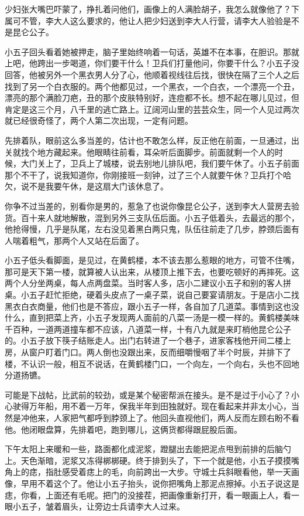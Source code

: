 少妇张大嘴巴吓蒙了，挣扎着问他们，画像上的人满脸胡子，我怎么就像他了？下属可不管，李大人这么要求的，他让人把少妇送到李大人行营，请李大人验验是不是昆仑公子。

小五子回头看着她被押走，脑子里始终响着一句话，英雄不在本事，在胆识。那就上吧，他跨出一步喝道，你们要干什么！卫兵们打量他问，你要干什么？小五子没回答，他被另外一个黑衣男人分了心，他顺着视线往后找，很快在隔了三个人之后找到了另一个白衣服的。两个他都见过，一个黑衣，一个白衣，一个漂亮一个丑，漂亮的那个满脸刀疤，丑的那个皮肤特别好，连痘都不长。想不起在哪儿见过，但肯定是这三个月，八千里的逃亡路上。辽阔河山里的芸芸众生，同一个人见过两次就已经很奇怪了，两个人第二次出现，一定有问题。

先排着队，眼前这么多当差的，估计也不敢怎么样，反正他在前面，一旦通过，出关就找个地方藏起来。他眼睛往前看，耳朵听后面脚步。前面就剩一个人的时
候，大门关上了，卫兵上了城楼，说去别地儿排队吧，我们要午休了。小五子前面那个不干了，说我知道你，你刚接班一刻钟，过了三个人就要午休？卫兵打个哈欠，说不是我要午休，是这扇大门该休息了。

你争不过当差的，别看你是男的，惹急了也说你像昆仑公子，送到李大人营房去验货。百十来人就地解散，混到另外三支队伍后面。小五子低着头，去最远的那个，他抢得慢，几乎是队尾，左右没见着黑白两只鬼，队伍往前走了几步，脖颈后面有人喘着粗气，那两个人又站在后面了。

小五子低头看脚面，是见过，在黄鹤楼，本不该去那么惹眼的地方，可管不住嘴，那可是天下第一楼，就算被人认出来，从楼顶上推下去，也要吃顿好的再摔死。这两个人分坐两桌，每人点两盘菜。当时客人多，店小二建议小五子和别的客人拼桌。小五子赶忙拒绝，硬着头皮点了一桌子菜，说自己要宴请朋友。于是店小二找黑衣白衣商量，他们也是不答应，跟小五子一样，各自加了几道菜。事情到这也没什么，直到把菜上齐，小五子发现两人面前的八菜一汤是一模一样的。黄鹤楼美味千百种，一道两道撞车都不应该，八道菜一样，十有八九就是来盯梢他昆仑公子的。小五子放下筷子结账走人。出门右转进了一个巷子，进家客栈他开间二楼上房，从窗户盯着门口。两人倒也没跟出来，反而细嚼慢咽了半个时辰，并排下了楼，不认识一般，相互不说话，在黄鹤楼门口，一个向左，一个向右，头也不回地分道扬镳。

可能是下战帖，比武前的较劲，或是某个秘密帮派在接头。是不是过于小心了？小心驶得万年船，用不着一万年，保我半年到田独就好。现在看起来并非太小心，当然是冲他来，人家把气都呼到脖颈上了。他回头直视他们，两人反而左顾右盼不看他。他闭眼盘算，先排着吧，跑到哪儿，这俩货都得跟屁股后面。

下午太阳上来暖和一些，路面都化成泥浆，蹬腿出去能把泥点甩到前排的后脑勺上。天色渐暗，泥浆又冻得梆梆硬。终于排到头了，下一个就是他，小五子摸摸嘴角上的痣，指肚感受着痣上的毛，向前跨出一大步。守城士兵斜眼看他，举一天画像，早用不着这个了。他让小五子抬头，说你把嘴角上那泥点擦掉。小五子说这是痣，你看，上面还有毛呢。把门的没接茬，把画像重新打开，看一眼画上人，看一眼小五子，皱着眉头，让旁边士兵请李大人过来。

